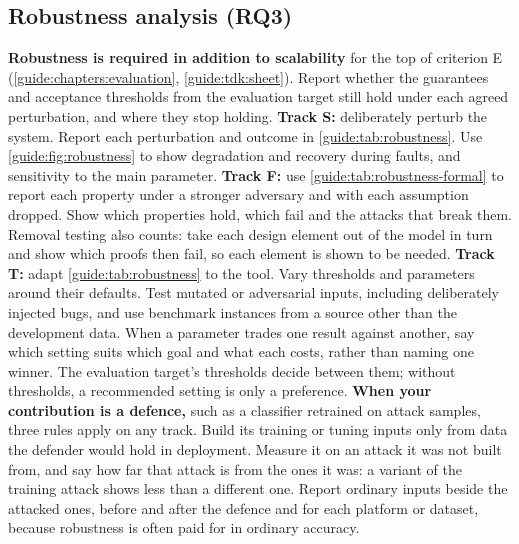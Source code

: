 \subsection[Robustness analysis (RQ3)]{Robustness analysis (RQ3)\skimmark}\label{guide:chapters:robustness}
\textbf{Robustness is required in addition to scalability} for the top of criterion E (\cref{guide:chapters:evaluation}, \cref{guide:tdk:sheet}).
Report whether the guarantees and acceptance thresholds from the evaluation target still hold under each agreed perturbation, and where they stop holding.
\textbf{Track S:} deliberately perturb the system. Report each perturbation and outcome in \cref{guide:tab:robustness}. Use \cref{guide:fig:robustness} to show degradation and recovery during faults, and sensitivity to the main parameter.
\textbf{Track F:} use \cref{guide:tab:robustness-formal} to report each property under a stronger adversary and with each assumption dropped. Show which properties hold, which fail and the attacks that break them. Removal testing also counts: take each design element out of the model in turn and show which proofs then fail, so each element is shown to be needed.
\textbf{Track T:} adapt \cref{guide:tab:robustness} to the tool. Vary thresholds and parameters around their defaults. Test mutated or adversarial inputs, including deliberately injected bugs, and use benchmark instances from a source other than the development data.
When a parameter trades one result against another, say which setting suits which goal and what each costs, rather than naming one winner. The evaluation target's thresholds decide between them; without thresholds, a recommended setting is only a preference.
\textbf{When your contribution is a defence,} such as a classifier retrained on attack samples, three rules apply on any track. Build its training or tuning inputs only from data the defender would hold in deployment. Measure it on an attack it was not built from, and say how far that attack is from the ones it was: a variant of the training attack shows less than a different one. Report ordinary inputs beside the attacked ones, before and after the defence and for each platform or dataset, because robustness is often paid for in ordinary accuracy.

